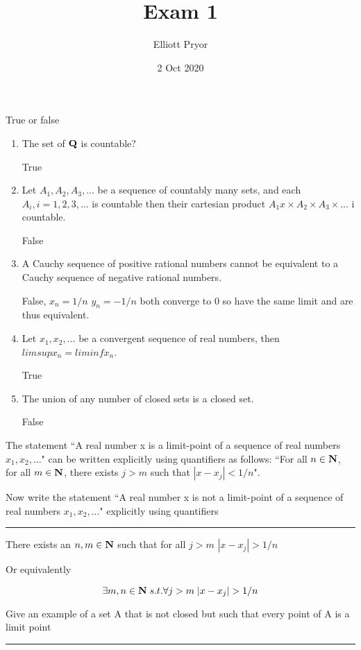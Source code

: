 \documentclass[11pt]{article}
\title{Exam 1}
\author{Elliott Pryor}
\date{2 Oct 2020}
\begin{document}
\maketitle

True or false

\begin{enumerate}
	\item The set of $\mathbf{Q}$ is countable? 
	
	True
	
	\item Let $A_1, A_2, A_3, ...$ be a sequence of countably many sets, and each $A_i, i = 1,2,3,...$ is countable then their cartesian product $A_1 x \times A_2 \times A_3 \times ...$ i countable.
	
	False
	
	\item A Cauchy sequence of positive rational numbers cannot be equivalent to a Cauchy sequence of negative rational numbers.
	
	False, $x_n = 1/n$ $y_n = -1/n$ both converge to 0 so have the same limit and are thus equivalent.
	
	\item Let $x_1, x_2, ...$ be a convergent sequence of real numbers, then $limsup x_n = liminf x_n$.
	
	True 
	
	\item The union of any number of closed sets is a closed set.
	
	False
	
\end{enumerate}

\newpage
{}
The statement ``A real number x is a limit-point of a sequence of real numbers $x_1, x_2, . . .$"
can be written explicitly using quantifiers as follows: ``For all $n \in \mathbf{N}$, for all $m \in \mathbf{N}$, there
exists $j > m$ such that $|x - x_j| < 1/n$". 

Now write the statement ``A real number x is
not a limit-point of a sequence of real numbers $x_1, x_2, ...$" explicitly using quantifiers
\hrule


There exists an $n, m \in \mathbf{N}$ such that for all $j > m$ $|x - x_j| > 1/n$

Or equivalently

$$\exists m, n \in \mathbf{N} \; s.t. \forall j > m \; |x - x_j| > 1/n$$


\newpage
{}
Give an example of a set A that is not closed but such that every point of A is a limit point
\hrule
\end{document}

